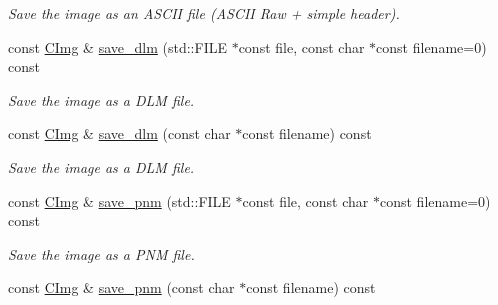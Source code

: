 \begin{DoxyCompactItemize}
\begin{DoxyCompactList}\small\item\em Save the image as an ASCII file (ASCII Raw + simple header). \item\end{DoxyCompactList}\item 
\hypertarget{structcimg__library_1_1_c_img_a189616455ee879a3372a13b860bab05c}{
const \hyperlink{structcimg__library_1_1_c_img}{CImg} \& \hyperlink{structcimg__library_1_1_c_img_a189616455ee879a3372a13b860bab05c}{save\_\-dlm} (std::FILE $\ast$const file, const char $\ast$const filename=0) const }
\label{structcimg__library_1_1_c_img_a189616455ee879a3372a13b860bab05c}

\begin{DoxyCompactList}\small\item\em Save the image as a DLM file. \item\end{DoxyCompactList}\item 
\hypertarget{structcimg__library_1_1_c_img_af33668c7503fcf0a797192012b501725}{
const \hyperlink{structcimg__library_1_1_c_img}{CImg} \& \hyperlink{structcimg__library_1_1_c_img_af33668c7503fcf0a797192012b501725}{save\_\-dlm} (const char $\ast$const filename) const }
\label{structcimg__library_1_1_c_img_af33668c7503fcf0a797192012b501725}

\begin{DoxyCompactList}\small\item\em Save the image as a DLM file. \item\end{DoxyCompactList}\item 
\hypertarget{structcimg__library_1_1_c_img_a5449e3262d461016ac4eb767963a231d}{
const \hyperlink{structcimg__library_1_1_c_img}{CImg} \& \hyperlink{structcimg__library_1_1_c_img_a5449e3262d461016ac4eb767963a231d}{save\_\-pnm} (std::FILE $\ast$const file, const char $\ast$const filename=0) const }
\label{structcimg__library_1_1_c_img_a5449e3262d461016ac4eb767963a231d}

\begin{DoxyCompactList}\small\item\em Save the image as a PNM file. \item\end{DoxyCompactList}\item 
\hypertarget{structcimg__library_1_1_c_img_aedf6a9b0a3333feee2bf369b9d484935}{
const \hyperlink{structcimg__library_1_1_c_img}{CImg} \& \hyperlink{structcimg__library_1_1_c_img_aedf6a9b0a3333feee2bf369b9d484935}{save\_\-pnm} (const char $\ast$const filename) const }
\label{structcimg__library_1_1_c_img_aedf6a9b0a3333feee2bf369b9d484935}


\end{DoxyCompactItemize}
